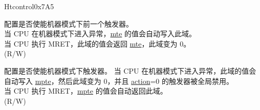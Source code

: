 \begin{register}{H}{tcontrol}{0x7A5}\label{regdesc:TCONTROL}
%
%
%
%
\regnewline%
\begin{regdesc}\begin{reglist}
\label{fielddesc:TCONTROLMPTE}\item [mpte] 配置是否使能机器模式下前一个触发器。\\
当 CPU 在机器模式下进入异常，\hyperref[fielddesc:TCONTROLMTE]{mte} 的值会自动写入此域。\\
当 CPU 执行 MRET，此域的值会返回 \hyperref[fielddesc:TCONTROLMTE]{mte}，此域变为 0。\\
(R/W)
\label{fielddesc:TCONTROLMTE}\item [mte] 配置是否使能机器模式下触发器。
当 CPU 在机器模式下进入异常，此域的值会自动写入 \hyperref[fielddesc:TCONTROLMPTE]{mpte}，然后此域变为 0，并且 \hyperref[fielddesc:MCONTROLACTION]{action}=0 的触发器被全局禁用。\\
当 CPU 执行 MRET，\hyperref[fielddesc:TCONTROLMPTE]{mpte} 的值会自动返回此域。\\
(R/W)
\end{reglist}\end{regdesc}
\end{register}

